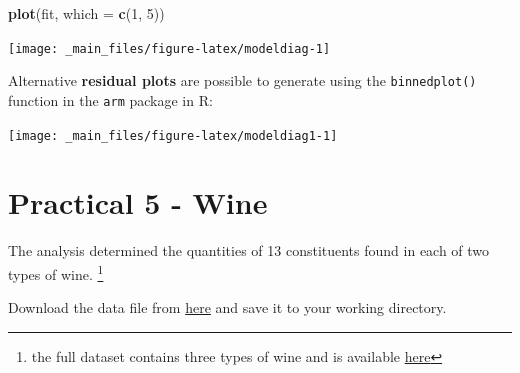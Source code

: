 \documentclass[]{book}
\newenvironment{Shaded}{\begin{snugshade}}{\end{snugshade}}
\newcommand{\KeywordTok}[1]{\textcolor[rgb]{0.13,0.29,0.53}{\textbf{#1}}}
\newcommand{\DataTypeTok}[1]{\textcolor[rgb]{0.13,0.29,0.53}{#1}}
\newcommand{\DecValTok}[1]{\textcolor[rgb]{0.00,0.00,0.81}{#1}}
\newcommand{\StringTok}[1]{\textcolor[rgb]{0.31,0.60,0.02}{#1}}
\newcommand{\CommentTok}[1]{\textcolor[rgb]{0.56,0.35,0.01}{\textit{#1}}}
\newcommand{\OperatorTok}[1]{\textcolor[rgb]{0.81,0.36,0.00}{\textbf{#1}}}
\newcommand{\NormalTok}[1]{#1}
\let\rmarkdownfootnote\footnote%
\def\footnote{\protect\rmarkdownfootnote}
\theoremstyle{definition}
\theoremstyle{definition}
\theoremstyle{definition}
\theoremstyle{remark}
\begin{document}
\begin{Shaded}
\begin{Highlighting}[]
\KeywordTok{plot}\NormalTok{(fit, }\DataTypeTok{which =} \KeywordTok{c}\NormalTok{(}\DecValTok{1}\NormalTok{, }\DecValTok{5}\NormalTok{))}
\end{Highlighting}
\end{Shaded}

\begin{center}\texttt{[image: \_main\_files/figure-latex/modeldiag-1]} \end{center}

Alternative \textbf{residual plots} are possible to generate using the
\texttt{binnedplot()} function in the \texttt{arm} package in R:

\begin{Shaded}
\end{Shaded}

\begin{center}\texttt{[image: \_main\_files/figure-latex/modeldiag1-1]} \end{center}

\section{Practical 5 - Wine}\label{practical-5---wine}

The analysis determined the quantities of 13 constituents found in each
of two types of wine. \footnote{the full dataset contains three types of
  wine and is available
  \href{https://archive.ics.uci.edu/ml/datasets/wine}{here}}

Download the data file from
\href{https://exeter-data-analytics.github.io/StatModelling/_data/wine.csv}{here}
and save it to your working directory.
\end{document}
